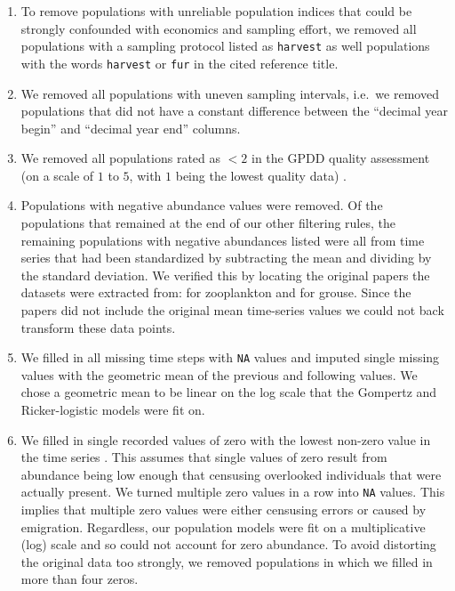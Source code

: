 \documentclass[12pt]{article}
\begin{document}
\begin{enumerate}

\item To remove populations with unreliable population indices that could be
  strongly confounded with economics and sampling effort, we removed all
  populations with a sampling protocol listed as \texttt{harvest} as well
  populations with the words \texttt{harvest} or \texttt{fur} in the cited
  reference title.

\item We removed all populations with uneven sampling intervals, i.e.\ we
  removed populations that did not have a constant difference between the
  ``decimal year begin'' and ``decimal year end'' columns.

\item We removed all populations rated as $< 2$ in the GPDD quality assessment
  (on a scale of $1$ to $5$, with $1$ being the lowest quality data)
  \citep{sibly2005, ziebarth2010}.

\item Populations with negative abundance values were removed. Of the
  populations that remained at the end of our other filtering rules, the
  remaining populations with negative abundances listed were all from time
  series that had been standardized by subtracting the mean and dividing by the
  standard deviation. We verified this by locating the original papers the
  datasets were extracted from: \citet{colebrook1978} for zooplankton and
  \citet{lindstrom1995} for grouse. Since the papers did not include the
  original mean time-series values we could not back transform these data
  points.

\item We filled in all missing time steps with \texttt{NA} values and imputed
  single missing values with the geometric mean of the previous and following
  values. We chose a geometric mean to be linear on the log scale that the
  Gompertz and Ricker-logistic models were fit on.

\item We filled in single recorded values of zero with the lowest non-zero
  value in the time series \citep{brook2006a}. This assumes that
  single values of zero result from abundance being low enough that censusing
  overlooked individuals that were actually present. We turned multiple zero
  values in a row into \texttt{NA} values. This implies that multiple zero
  values were either censusing errors or caused by emigration. Regardless, our
  population models were fit on a multiplicative (log) scale and so could not
  account for zero abundance. To avoid distorting the original data too
  strongly, we removed populations in which we filled in more than four zeros.


\end{enumerate}
\end{document}
